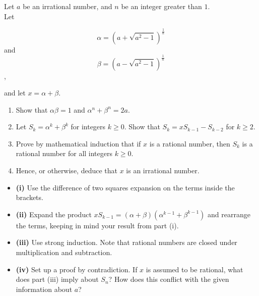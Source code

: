 \begin{problem}
Let $a$ be an irrational number, and $n$ be an integer greater than $1$. \\
Let 

$$\alpha = (a + \sqrt{a^2 - 1})^{\frac{1}{n}}$$ and 
$$\beta = (a - \sqrt{a^2 - 1})^{\frac{1}{n}}$$, 

and let $x = \alpha + \beta$.

\begin{enumerate}[label=(\roman*)]
    \item Show that $\alpha\beta = 1$ and $\alpha^n + \beta^n = 2a$.
    \item Let $S_k = \alpha^k + \beta^k$ for integers $k \ge 0$. Show that $S_k = xS_{k-1} - S_{k-2}$ for $k \ge 2$.
    \item Prove by mathematical induction that if $x$ is a rational number, then $S_k$ is a rational number for all integers $k \ge 0$.
    \item Hence, or otherwise, deduce that $x$ is an irrational number.
\end{enumerate}
\end{problem}

\begin{hint}
\begin{itemize}
    \item \textbf{(i)} Use the difference of two squares expansion on the terms inside the brackets.
    \item \textbf{(ii)} Expand the product $xS_{k-1} = (\alpha + \beta)(\alpha^{k-1} + \beta^{k-1})$ and rearrange the terms, keeping in mind your result from part (i).
    \item \textbf{(iii)} Use strong induction. Note that rational numbers are closed under multiplication and subtraction.
    \item \textbf{(iv)} Set up a proof by contradiction. If $x$ is assumed to be rational, what does part (iii) imply about $S_n$? How does this conflict with the given information about $a$?
\end{itemize}
\end{hint}

